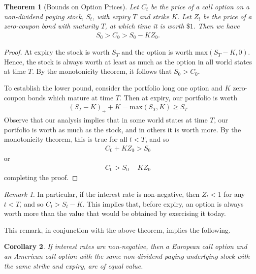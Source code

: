\documentclass[12pt]{article}
\theoremstyle{plain}
\newtheorem{theorem}{Theorem}
\newtheorem{corollary}[theorem]{Corollary}
\theoremstyle{definition}
\theoremstyle{remark}
\newtheorem*{remark}{Remark}
\numberwithin{equation}{section}  %
\begin{document}
\begin{theorem}[Bounds on Option Prices]
Let $C_t$ be the price of a call option on a non-dividend paying stock, $S_t$, with
expiry $T$ and strike $K$. Let $Z_t$ be the price of a zero-coupon bond with maturity $T$, at which time
it is worth $\$1$. 
Then we have
\begin{equation*}
\begin{split}
    S_{0} > C_{0} > S_{0} - KZ_{0}.
\end{split}
\end{equation*}
\label{thm:bound-op-prices}
\end{theorem}
\begin{proof}
    At expiry the stock is worth $S_{T}$ and the option is worth
    $\text{max}(S_{T} - K, 0)$. Hence, the stock is always worth at least as much
    as the option in all world states at time $T$. By the monotonicity theorem, it follows
    that $S_{0} > C_{0}$. 

    To establish the lower pound, consider the portfolio long one option and $K$ zero-coupon bonds which
    mature at time $T$. Then at expiry, our portfolio is worth
    \begin{equation*}
    \begin{split}
        {(S_{T} - K)}_{+} + K =  \text{max}(S_{T}, K) \ge S_{T}
    \end{split}
    \end{equation*}
    Observe that our analysis implies that in some world states at time $T$, our portfolio is worth as much as the stock, and in others it is worth more. By the monotonicity theorem, this is true for all $t < T$, and so
    \begin{equation*}
    \begin{split}
        C_{0} + KZ_{0} > S_{0} 
    \end{split}
    \end{equation*}
    or
    \begin{equation*}
    \begin{split}
        C_{0} > S_{0} - KZ_{0}
    \end{split}
    \end{equation*}
    completing the proof.
\end{proof}
\begin{remark}
    In particular, if the interest rate is non-negative, then $Z_{t} < 1$ for any $t < T$, and so
    $C_{t} > S_{t} - K$. This implies that, before expiry, an option is always worth more than the value
    that would be obtained by exercising it today.
\end{remark}
This remark, in conjunction with the above theorem, implies the following.
\begin{corollary}
\label{am-eu-equiv}
If interest rates are non-negative, then a European call option and an American call option with the same
non-dividend paying underlying stock with the same strike and expiry, are of equal value. 
\end{corollary}
\end{document}
